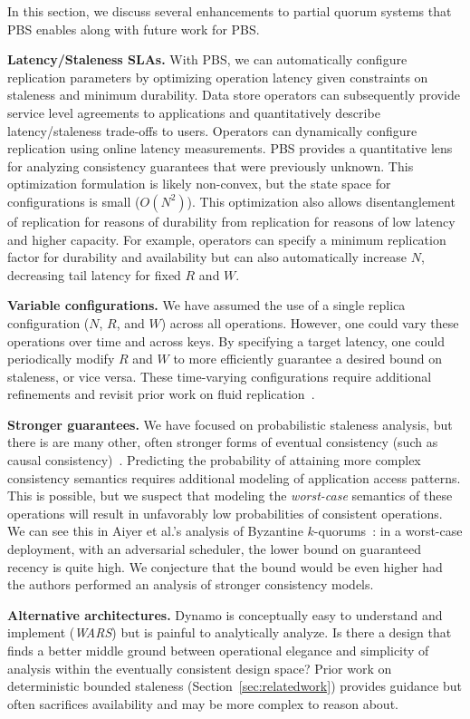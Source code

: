 \documentclass{vldb}
\begin{document}
In this section, we discuss several enhancements to partial
quorum systems that PBS enables along with future work for PBS.

\textbf{Latency/Staleness SLAs.} With PBS, we can automatically
configure replication parameters by optimizing operation latency given
constraints on staleness and minimum durability.  Data store operators
can subsequently provide service level agreements to applications and
quantitatively describe latency/staleness trade-offs to users.
Operators can dynamically configure replication using online latency
measurements.  PBS provides a quantitative lens for analyzing
consistency guarantees that were previously unknown.  This
optimization formulation is likely non-convex, but the state space for
configurations is small ($O(N^2)$).  This optimization also allows
disentanglement of replication for reasons of durability from
replication for reasons of low latency and higher capacity.  For
example, operators can specify a minimum replication factor for
durability and availability but can also automatically increase
$N$, decreasing tail latency for fixed $R$ and $W$.

\textbf{Variable configurations.} We have assumed the use of a single
replica configuration ($N$, $R$, and $W$) across all operations.
However, one could vary these operations over time and across keys.
By specifying a target latency, one could periodically modify $R$ and
$W$ to more efficiently guarantee a desired bound on staleness, or
vice versa. These time-varying configurations require additional
refinements and revisit prior work on fluid
replication~\cite{fluidreplication}.

\textbf{Stronger guarantees.} We have focused on probabilistic
staleness analysis, but there is are many other, often stronger forms of eventual
consistency (such as causal consistency)~\cite{vogels-defs}.
Predicting the probability of attaining more complex consistency
semantics requires additional modeling of application access patterns.
This is possible, but we suspect that modeling the \textit{worst-case}
semantics of these operations will result in unfavorably low
probabilities of consistent operations.  We can see this in Aiyer et
al.'s analysis of Byzantine $k$-quorums~\cite{multi-k-quorum}: in a
worst-case deployment, with an adversarial scheduler, the lower bound
on guaranteed recency is quite high.  We conjecture that the bound
would be even higher had the authors performed an analysis of stronger
consistency models.

\textbf{Alternative architectures.} Dynamo is conceptually easy to
understand and implement (\textit{WARS}) but is painful to
analytically analyze.  Is there a design that finds a better middle
ground between operational elegance and simplicity of analysis within
the eventually consistent design space?  Prior work on deterministic
bounded staleness (Section~\ref{sec:relatedwork}) provides guidance
but often sacrifices availability and may be more complex to reason
about.
\end{document}
